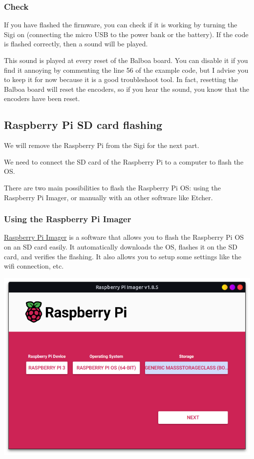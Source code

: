 \documentclass{article}
\begin{document}
\subsubsection{Check}
If you have flashed the firmware, you can check if it is working by turning the Sigi on
(connecting the micro USB to the power bank or the battery). If the code is flashed correctly, then
a sound will be played.

This sound is played at every reset of the Balboa board.
You can disable it if you find it annoying by commenting the line 56 of the example code, but I
advise you to keep it for now because it is a good troubleshoot tool. In fact, resetting the Balboa
board will reset the encoders, so if you hear the sound, you know that the encoders have been
reset.

\subsection{Raspberry Pi SD card flashing}

We will remove the Raspberry Pi from the Sigi for the next part.

We need to connect the SD card of the Raspberry Pi to a computer to flash the OS.

There are two main possibilities to flash the Raspberry Pi OS: using the Raspberry Pi Imager, or
manually with an other software like Etcher.

\subsubsection{Using the Raspberry Pi Imager}

\href{https://www.raspberrypi.com/software/}{Raspberry Pi Imager} is a software that allows you to
flash the Raspberry Pi OS on an SD card easily.
It automatically downloads the OS, flashes it on the SD card, and verifies the flashing.
It also allows you to setup some settings like the wifi connection, etc.

\includegraphics[scale=0.4]{img/imager_next.png}
\end{document}
